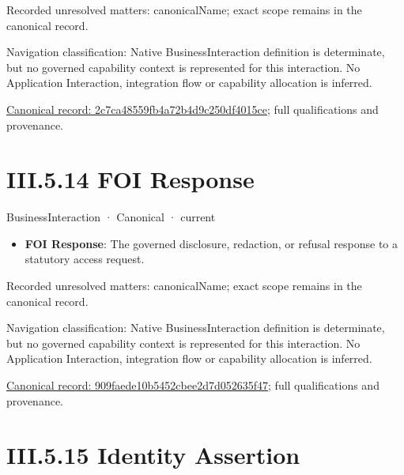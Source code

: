 {\small Recorded unresolved matters: canonicalName; exact scope remains in the canonical record.}\par
{\small Navigation classification: Native BusinessInteraction definition is determinate, but no governed capability context is represented for this interaction. No Application Interaction, integration flow or capability allocation is inferred.}\par
{\footnotesize \href{../../../../../../../../continuum/business/business-interaction/2c7ca48559fb4a72b4d9c250df4015ce.md}{Canonical record: 2c7ca48559fb4a72b4d9c250df4015ce}; full qualifications and provenance.}\par
\section*{III.5.14 FOI Response}
\label{navigation:III.5.14}

\label{element:909faede10b5452cbee2d7d052635f47}
{\small BusinessInteraction · Canonical · current}\par

\begin{itemize}


\item \textbf{FOI Response}: The governed disclosure, redaction, or refusal response to a statutory access request.

\end{itemize}

{\small Recorded unresolved matters: canonicalName; exact scope remains in the canonical record.}\par
{\small Navigation classification: Native BusinessInteraction definition is determinate, but no governed capability context is represented for this interaction. No Application Interaction, integration flow or capability allocation is inferred.}\par
{\footnotesize \href{../../../../../../../../continuum/business/business-interaction/909faede10b5452cbee2d7d052635f47.md}{Canonical record: 909faede10b5452cbee2d7d052635f47}; full qualifications and provenance.}\par
\section*{III.5.15 Identity Assertion}
\label{navigation:III.5.15}


